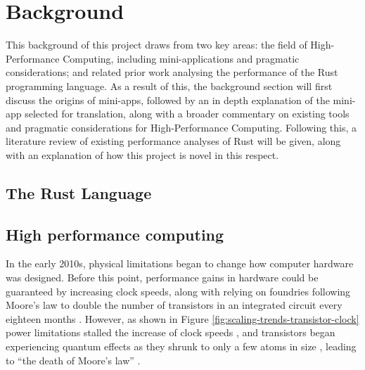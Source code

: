 \chapter{Background}
\label{ch:background}


This background of this project draws from two key areas: the field of High-Performance Computing, including mini-applications  and pragmatic considerations; and related prior work analysing the performance of the Rust programming language. As a result of this, the background section will first discuss the origins of mini-apps, followed by an in depth explanation of the mini-app selected for translation, along with a broader commentary on existing tools and pragmatic considerations for High-Performance Computing. Following this, a literature review of existing performance analyses of Rust will be given, along with an explanation of how this project is novel in this respect.


\section{The Rust Language}
\label{sec:rust} %




\section{High performance computing}
\label{sec:hpc} %


In the early 2010s, physical limitations began to change how computer hardware was designed. Before this point, performance gains in hardware could be guaranteed by increasing clock speeds, along with relying on foundries following Moore's law to double the number of transistors in an integrated circuit every eighteen months \cite{}. However, as shown in Figure \ref{fig:scaling-trends-transistor-clock} power limitations stalled the increase of clock speeds \cite{}, and transistors began experiencing quantum effects as they shrunk to only a few atoms in size \cite{}, leading to ``the death of Moore's law'' \cite{}.

